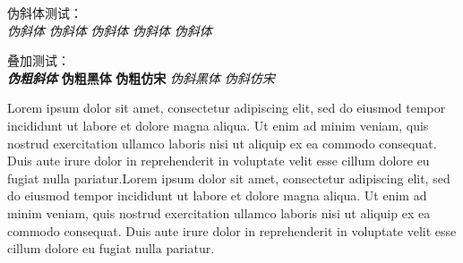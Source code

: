 伪斜体测试：\\
{\itshape\songti 伪斜体} {\itshape\kaishu 伪斜体} {\itshape\heiti 伪斜体} {\itshape\fangsong 伪斜体} {\itshape 伪斜体}

叠加测试：\\
{\bfseries\itshape 伪粗斜体} {\bfseries\sffamily 伪粗黑体} {\bfseries\ttfamily 伪粗仿宋} {\itshape\sffamily 伪斜黑体} {\itshape\ttfamily 伪斜仿宋}

Lorem ipsum dolor sit amet, consectetur adipiscing elit, sed do eiusmod tempor incididunt ut labore et dolore magna aliqua. Ut enim ad minim veniam, quis nostrud exercitation ullamco laboris nisi ut aliquip ex ea commodo consequat. Duis aute irure dolor in reprehenderit in voluptate velit esse cillum dolore eu fugiat nulla pariatur.Lorem ipsum dolor sit amet, consectetur adipiscing elit, sed do eiusmod tempor incididunt ut labore et dolore magna aliqua. Ut enim ad minim veniam, quis nostrud exercitation ullamco laboris nisi ut aliquip ex ea commodo consequat. Duis aute irure dolor in reprehenderit in voluptate velit esse cillum dolore eu fugiat nulla pariatur.